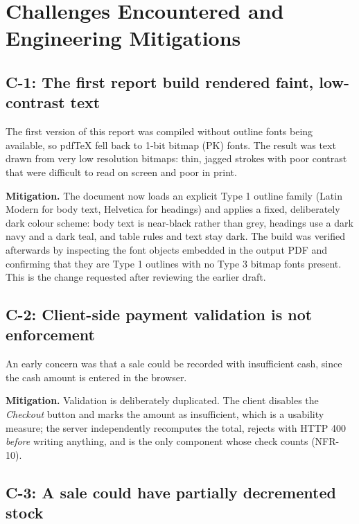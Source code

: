 \documentclass[11pt,a4paper]{article}
\newcommand{\code}[1]{\texttt{\small\color{codefg}\detokenize{#1}}}
\begin{document}
\section{Challenges Encountered and Engineering Mitigations}

\subsection{C-1: The first report build rendered faint, low-contrast text}

The first version of this report was compiled without outline fonts being available, so
pdfTeX fell back to 1-bit bitmap (PK) fonts. The result was text drawn from very low
resolution bitmaps: thin, jagged strokes with poor contrast that were difficult to read on
screen and poor in print.

\textbf{Mitigation.} The document now loads an explicit Type 1 outline family (Latin Modern
for body text, Helvetica for headings) and applies a fixed, deliberately dark colour scheme:
body text is near-black rather than grey, headings use a dark navy and a dark teal, and
table rules and text stay dark. The build was verified afterwards by inspecting the font
objects embedded in the output PDF and confirming that they are Type 1 outlines with no
Type 3 bitmap fonts present. This is the change requested after reviewing the earlier draft.

\subsection{C-2: Client-side payment validation is not enforcement}

An early concern was that a sale could be recorded with insufficient cash, since the cash
amount is entered in the browser.

\textbf{Mitigation.} Validation is deliberately duplicated. The client disables the
\emph{Checkout} button and marks the amount as insufficient, which is a usability measure;
the server independently recomputes the total, rejects \code{paidAmount $<$ total} with HTTP
400 \emph{before} writing anything, and is the only component whose check counts (NFR-10).

\subsection{C-3: A sale could have partially decremented stock}
\end{document}
